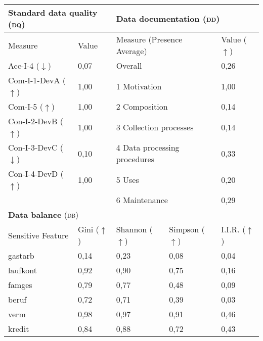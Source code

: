 \begin{table}[h]
\begin{tabular}{|p{3cm}|p{1.9cm}p{3cm}p{2.6cm}p{1.6cm}|}
        \multicolumn{2}{|l|}{\textbf{Standard data quality} (\textsc{dq})} & \multicolumn{3}{|l|}{\textbf{Data documentation} (\textsc{dd})}\\ \hline
        Measure & Value & \multicolumn{2}{|l|}{Measure (Presence Average)} & Value ($\uparrow$) \\ \hline
        Acc-I-4 ($\downarrow$) & 0,07\cellcolor[HTML]{FEF7F5} & \multicolumn{2}{|l|}{Overall} & 0,26\cellcolor[HTML]{FCAD96} \\
        Com-I-1-DevA ($\uparrow$) & 1,00\cellcolor[HTML]{FFFFFF} & \multicolumn{2}{|l|}{1 Motivation} & 1,00\cellcolor[HTML]{FFFFFF} \\
        Com-I-5 ($\uparrow$) & 1,00\cellcolor[HTML]{FFFFFF} & \multicolumn{2}{|l|}{2 Composition} & 0,14\cellcolor[HTML]{FCA186} \\
        Con-I-2-DevB ($\uparrow$) & 1,00\cellcolor[HTML]{FFFFFF} & \multicolumn{2}{|l|}{3 Collection processes} & 0,14\cellcolor[HTML]{FCA186} \\
        Con-I-3-DevC ($\downarrow$) & 0,10\cellcolor[HTML]{FEF3F0} & \multicolumn{2}{|l|}{4 Data processing procedures} & 0,33\cellcolor[HTML]{FDB6A0} \\
        Con-I-4-DevD ($\uparrow$) & 1,00\cellcolor[HTML]{FFFFFF} & \multicolumn{2}{|l|}{5 Uses} & 0,20\cellcolor[HTML]{FCA78E} \\ 
         & & \multicolumn{2}{|l|}{6 Maintenance} & 0,29\cellcolor[HTML]{FCB19A} \\ \hline
        \multicolumn{5}{|l|}{\textbf{Data balance} (\textsc{db})} \\ \hline 
 		Sensitive Feature & Gini ($\uparrow$) & Shannon ($\uparrow$) & Simpson ($\uparrow$) & I.I.R. ($\uparrow$) \\ \hline
        gastarb & 0,14\cellcolor[HTML]{fc8d59} & 0,23\cellcolor[HTML]{fc8d59} & 0,08\cellcolor[HTML]{fc8d59} & 0,04\cellcolor[HTML]{fc8d59} \\
		laufkont & 0,92 & 0,90 & 0,75 & 0,16 \\
		famges & 0,79 & 0,77 & 0,48 & 0,09\cellcolor[HTML]{fc8d59} \\
		beruf & 0,72 & 0,71 & 0,39 & 0,03\cellcolor[HTML]{fc8d59} \\
		verm & 0,98 & 0,97 & 0,91 & 0,46 \\
		kredit & 0,84 & 0,88 & 0,72 & 0,43 \\
		 \hline
    \end{tabular}
\end{table}